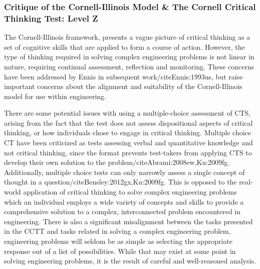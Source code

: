 \subsubsection{Critique of the Cornell-Illinois Model & The Cornell Critical Thinking Test: Level Z}

The Cornell-Illinois framework, presents a vague picture of critical thinking as a set of cognitive skills that are applied to form a course of action.  However, the type of thinking required in solving complex engineering problems is not linear in nature, requiring continual assessment, reflection and monitoring.  These concerns have been addressed by Ennis in subsequent work/cite{Ennis:1993us}, but raise important concerns about the alignment and suitability of the Cornell-Illinois model for use within engineering.  

There are some potential issues with using a multiple-choice assessment of CTS, arising from the fact that the test does not assess dispositional aspects of critical thinking, or how individuals chose to engage in critical thinking.  Multiple choice CT have been criticized as tests assessing verbal and quantitative knowledge and not critical thinking, since the format prevents test-takers from applying CTS to develop their own solution to the problem/cite{Abrami:2008ew,Ku:2009fg}. Additionally, multiple choice tests can only narrowly assess a single concept of thought in a question/cite{Bensley:2012gx,Ku:2009fg}.  This is opposed to the real-world application of critical thinking to solve complex engineering problems which an individual employs a wide variety of concepts and skills to provide a comprehensive solution to a complex, interconnected problem encountered in engineering.  There is also a significant misalignment between the tasks presented in the CCTT and tasks related in solving a complex engineering problem, engineering problems will seldom be as simple as selecting the appropriate response out of a list of possibilities.  While that may exist at some point in solving engineering problems, it is the result of careful and well-reasoned analysis.